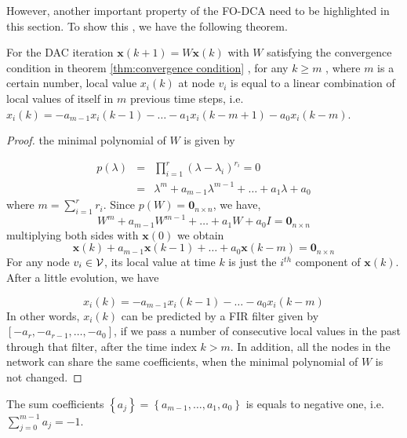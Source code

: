 However, another important property of the FO-DCA need to be highlighted
in this section. To show this , we have the following theorem.
\begin{thm}
\label{thm:LV predictor a_i} For the DAC iteration $\mathbf{x}(k+1)=W\mathbf{x}(k)$
with $W$ satisfying the convergence condition in theorem \ref{thm:convergence condition}
, for any $k\geq m$ , where $m$ is a certain number, local value
\textup{$x_{i}\left(k\right)$} at node $v_{i}$ is equal to a linear
combination of local values of itself in $m$ previous time steps,
i.e. $x_{i}\left(k\right)=-a_{m-1}x_{i}\left(k-1\right)-\ldots-a_{1}x_{i}\left(k-m+1\right)-a_{0}x_{i}\left(k-m\right)$. \end{thm}
\begin{proof}
the minimal polynomial of $W$ is given by

\begin{eqnarray}
p(\lambda) & = & \prod_{i=1}^{r}\left(\lambda-\lambda_{i}\right)^{r_{i}}=0\nonumber \\
 & = & \lambda^{m}+a_{m-1}\lambda^{m-1}+\ldots+a_{1}\lambda+a_{0}\label{eq:polynomial of matrix W}
\end{eqnarray}
where $m=\sum_{i=1}^{r}r_{i}$. Since $p\left(W\right)=\mathbf{0}_{n\times n}$,
we have, 
\[
W^{m}+a_{m-1}W^{m-1}+\ldots+a_{1}W+a_{0}I=\mathbf{0}_{n\times n}
\]
multiplying both sides with $\mathbf{x}\left(0\right)$ we obtain
\begin{equation}
\mathbf{x}\left(k\right)+a_{m-1}\mathbf{x}\left(k-1\right)+\ldots+a_{0}\mathbf{x}\left(k-m\right)=\mathbf{0}_{n\times n}\label{eq:x(k+r) vector predictor}
\end{equation}
For any node $v_{i}\in{\cal V}$, its local value at time $k$ is
just the $i^{th}$ component of $\mathbf{x}\left(k\right)$. After
a little evolution, we have

\begin{equation}
x_{i}\left(k\right)=-a_{m-1}x_{i}\left(k-1\right)-\ldots-a_{0}x_{i}\left(k-m\right)\label{eq:x(k+r) predictor}
\end{equation}
In other words, $x_{i}\left(k\right)$ can be predicted by a FIR filter
given by $\left[-a_{r},-a_{r-1},\ldots,-a_{0}\right]$, if we pass
a number of consecutive local values in the past through that filter,
after the time index $k>m$. In addition, all the nodes in the network
can share the same coefficients, when the minimal polynomial of $W$
is not changed.\end{proof}
\begin{lem}
\label{lem:Sum-coef.=00003D1}The sum coefficients \textup{$\left\{ a_{j}\right\} =\left\{ a_{m-1},\ldots,a_{1},a_{0}\right\} $}
is equals to negative one, i.e. $\sum_{j=0}^{m-1}a_{j}=-1$\textup{. }\end{lem}
